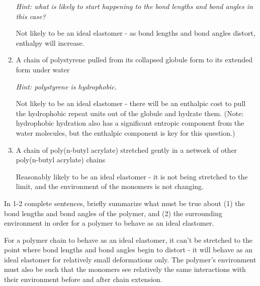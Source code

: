 \begin{activity}
\begin{ctqs}
\begin{enumerate}
				\emph{Hint: what is likely to start happening to the bond lengths and bond angles in this case?}
		
				\begin{solution}[0.75in]
					Not likely to be an ideal elastomer - as bond lengths and bond angles distort, enthalpy will increase.
				\end{solution}
				
			\item A chain of polystyrene pulled from its collapsed globule form to its extended form under water
			
				\emph{Hint: polystyrene is hydrophobic.}
		
				\begin{solution}[0.75in]
					Not likely to be an ideal elastomer - there will be an enthalpic cost to pull the hydrophobic repeat units out of the globule and hydrate them.  (Note: hydrophobic hydration also has a significant entropic component from the water molecules, but the enthalpic component is key for this question.)
				\end{solution}
			
			\item A chain of poly(n-butyl acrylate) stretched gently in a network of other poly(n-butyl acrylate) chains
		
				\begin{solution}[0.75in]
					Reasonably likely to be an ideal elastomer - it is not being stretched to the limit, and the environment of the monomers is not changing.
				\end{solution}
		\end{enumerate}	
	
	\question In 1-2 complete sentences, briefly summarize what must be true about (1) the bond lengths and bond angles of the polymer, and (2) the surrounding environment in order for a polymer to behave as an ideal elastomer.
		
		\begin{solution}[1.5in]
			For a polymer chain to behave as an ideal elastomer, it can't be stretched to the point where bond lengths and bond angles begin to distort - it will behave as an ideal elastomer for relatively small deformations only.  The polymer's environment must also be such that the monomers see relatively the same interactions with their environment before and after chain extension.
		\end{solution}

\end{ctqs}


\end{activity}
